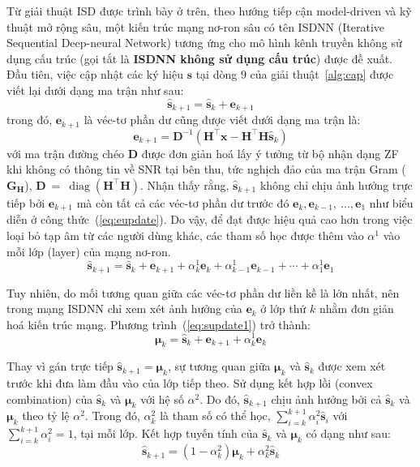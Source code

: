 Từ giải thuật ISD được trình bày ở trên, theo hướng tiếp cận model-driven và kỹ thuật mở rộng sâu, một kiến trúc mạng nơ-ron sâu có tên ISDNN (Iterative Sequential Deep-neural Network) tương ứng cho mô hình kênh truyền không sử dụng cấu trúc (gọi tắt là \textbf{ISDNN không sử dụng cấu trúc}) được đề xuất. Đầu tiên, việc cập nhật các ký hiệu $\mathbf{s}$ tại dòng $9$ của giải thuật~\ref{alg:cap} được viết lại dưới dạng ma trận như sau:
\begin{equation}
\hat{\mathbf{s}}_{k+1}=\hat{\mathbf{s}}_k+\mathbf{e}_{k+1}
\end{equation}
trong đó, $\mathbf{e}_{k+1}$ là véc-tơ phần dư cũng được viết dưới dạng ma trận là:
\begin{equation}
    \mathbf{e}_{k+1}=\mathbf{D}^{-1}\left(\mathbf{H}^\top \mathbf{x}-\mathbf{H}^\top \mathbf{H} \hat{\mathbf{s}}_k\right)
\end{equation}
với ma trận đường chéo $\mathbf{D}$ được đơn giản hoá lấy ý tưởng từ bộ nhận dạng ZF khi không có thông tin về SNR tại bên thu, tức nghịch đảo của ma trận Gram ($\mathbf{G}_\mathbf{H}$), $\mathbf{D}~=~\operatorname{diag}(\mathbf{H}^\top \mathbf{H})$. 
Nhận thấy rằng, $\hat{\mathbf{s}}_{k+1}$ không chỉ chịu ảnh hưởng trực tiếp bởi $\mathbf{e}_{k+1}$ mà còn tất cả các véc-tơ phần dư trước đó $\mathbf{e}_{k}, \mathbf{e}_{k-1},~\ldots, \mathbf{e}_{1}$ như biểu diễn ở công thức~(\ref{eq:eupdate}). Do vậy, để đạt được hiệu quả cao hơn trong việc loại bỏ tạp âm từ các người dùng khác, các tham số học được thêm vào $\alpha^1$ vào mỗi lớp (layer) của mạng nơ-ron.
\begin{equation}
\label{eq:supdate1}
\hat{\mathbf{s}}_{k+1}=\hat{\mathbf{s}}_k+\mathbf{e}_{k+1}+\alpha_k^{1} \mathbf{e}_k+\alpha_{k-1}^{1} \mathbf{e}_{k-1}+\cdots+\alpha_1^{1} \mathbf{e}_1
\end{equation}

Tuy nhiên, do mối tương quan giữa các véc-tơ phần dư liền kề là lớn nhất, nên trong mạng ISDNN chỉ xem xét ảnh hưởng của $\mathbf{e}_k$ ở lớp thứ $k$ nhằm đơn giản hoá kiến trúc mạng. Phương trình~(\ref{eq:supdate1}) trở thành:
\begin{equation}
\boldsymbol{\mu}_{k}=\hat{\mathbf{s}}_k+\mathbf{e}_{k+1}+\alpha_k^1 \mathbf{e}_k
\end{equation}

Thay vì gán trực tiếp $\hat{\mathbf{s}}_{k+1} = \boldsymbol{\mu}_k$, sự tương quan giữa $\boldsymbol{\mu}_k$ và $\hat{\mathbf{s}}_k$ được xem xét trước khi đưa làm đầu vào của lớp tiếp theo. Sử dụng kết hợp lồi (convex combination) của $\hat{\mathbf{s}}_k$ và $\boldsymbol{\mu}_k$ với hệ số $\alpha^2$. Do đó, $\hat{\mathbf{s}}_{k+1}$ chịu ảnh hưởng bởi cả $\hat{\mathbf{s}}_k$ và $\boldsymbol{\mu}_k$ theo tỷ lệ $\alpha^2$. 
Trong đó, $\alpha^2_k$ là tham số có thể học, $\sum_{i=k}^{k+1} \alpha_i^{2} \hat{\mathbf{s}}_i$ với $\sum_{i=k}^{k+1} \alpha_i^{2}=1$, tại mỗi lớp. Kết hợp tuyến tính của $\hat{\mathbf{s}}_k$ và $\boldsymbol{\mu}_k$ có dạng như sau:
\begin{equation}
\hat{\mathbf{s}}_{k+1}=\left(1-\alpha_k^2\right) \boldsymbol{\mu}_k + \alpha_k^2 \hat{\mathbf{s}}_k
\end{equation}

